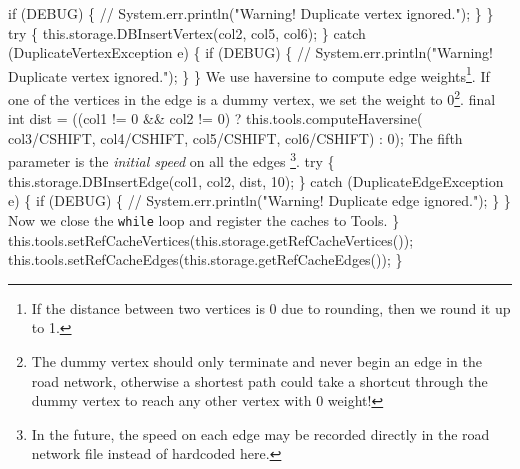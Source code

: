   if (DEBUG) \{
    // System.err.println("Warning! Duplicate vertex ignored.");
  \}
\}
try \{
  this.storage.DBInsertVertex(col2, col5, col6);
\} catch (DuplicateVertexException e) \{
  if (DEBUG) \{
    // System.err.println("Warning! Duplicate vertex ignored.");
  \}
\}
\nwendcode{}\nwdocspar
{\small We use haversine to compute edge weights\footnote{If the distance between two
vertices is 0 due to rounding, then we round it up to 1.}.  If one of the
vertices in the edge is a dummy vertex, we set the weight to 0\footnote{The
dummy vertex should only terminate and never begin an edge in the road network,
otherwise a shortest path could take a shortcut through the dummy vertex to
reach any other vertex with 0 weight!}.}
\nwenddocs{}\plusendmoddef
final int dist = ((col1 != 0 && col2 != 0)
  ? this.tools.computeHaversine(
        col3/CSHIFT, col4/CSHIFT,
        col5/CSHIFT, col6/CSHIFT) : 0);
\nwendcode{}\nwdocspar
{\small The fifth parameter is the \textit{initial speed} on all the edges
\footnote{In the future, the speed on each edge may be recorded directly in the
road network file instead of hardcoded here.}.}
\nwenddocs{}\plusendmoddef
try \{
  this.storage.DBInsertEdge(col1, col2, dist, 10);
\} catch (DuplicateEdgeException e) \{
  if (DEBUG) \{
    // System.err.println("Warning! Duplicate edge ignored.");
  \}
\}
\nwendcode{}\nwdocspar
{\small Now we close the {\tt{}while} loop and register the caches to Tools.}
\nwenddocs{}\plusendmoddef
  \}
  this.tools.setRefCacheVertices(this.storage.getRefCacheVertices());
  this.tools.setRefCacheEdges(this.storage.getRefCacheEdges());
\}
\nwendcode{}\nwdocspar

